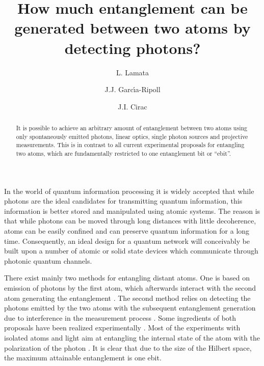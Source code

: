 \documentclass[12pt,aps,prl,onecolumn,superscriptaddress,showpacs,nofootonbib]{revtex4-2}
\begin{document}
\title{How much entanglement can be generated between two atoms by detecting photons?}


\author{L. Lamata}
 


\author{J.J. Garc\'{\i}a-Ripoll}

\author{J.I. Cirac}



\begin{abstract}
  It is possible to achieve an arbitrary amount of entanglement
  between two atoms using only spontaneously emitted photons, linear
  optics, single photon sources and projective measurements. This is
  in contrast to all current experimental proposals for entangling two
  atoms, which are fundamentally restricted to one entanglement bit
  or ``ebit''.
\end{abstract}


\maketitle

In the world of quantum information processing it is widely accepted
that while photons are the ideal candidates for transmitting quantum
information, this information is better stored and manipulated using
atomic systems. The reason is that while photons can be moved through
long distances with little decoherence, atoms can be easily confined
and can preserve quantum information for a long time.  Consequently,
an ideal design for a quantum network will conceivably be built upon a
number of atomic or solid state devices which communicate through
photonic quantum channels.

There exist mainly two methods for entangling distant atoms. One is
based on emission of photons by the first atom, which afterwards
interact with the second atom generating the entanglement
\cite{CirZolKimMab97,EnkCirZol97,GheSaaTorCirZol98,ParKim00,ChaLawEbe02,ChaLawEbe03}.
The second method relies on detecting the photons emitted by the two
atoms with the subsequent entanglement generation due to
interference in the measurement process
\cite{Cabrillo99,BosKniPleVed99}. Some ingredients of both proposals
have been realized experimentally
\cite{Polzik01,Rempe02,Kimble04,Blinov04,Volz05,Kuzmich06,Grangier06,Maunz06,Kimble05,Darquie06}.
Most of the experiments with isolated atoms and light aim at
entangling the internal state of the atom with the polarization of
the photon
\cite{Rempe02,Kimble04,Blinov04,Volz05,Kuzmich06,Grangier06,Maunz06,Darquie06}.
It is clear that due to the size of the Hilbert space, the maximum
attainable entanglement is one ebit.
\end{document}
